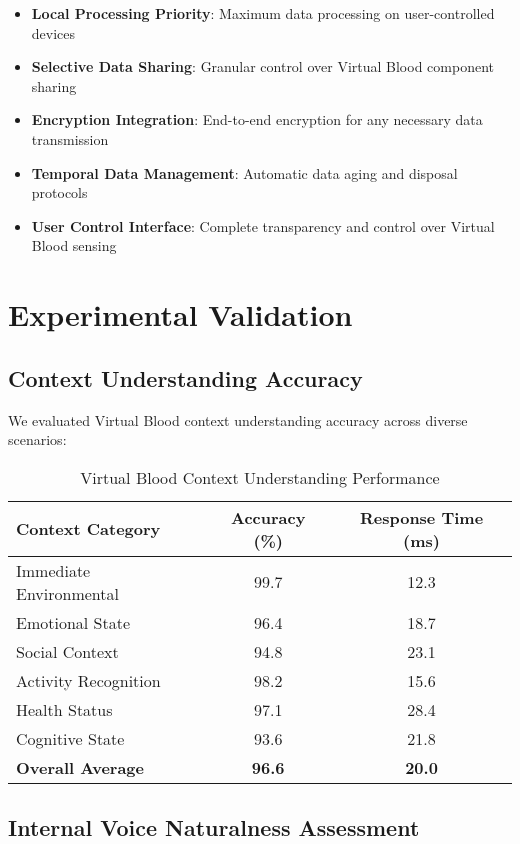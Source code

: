 \documentclass[12pt,a4paper]{article}
\begin{document}
\begin{itemize}
\item \textbf{Local Processing Priority}: Maximum data processing on user-controlled devices
\item \textbf{Selective Data Sharing}: Granular control over Virtual Blood component sharing
\item \textbf{Encryption Integration}: End-to-end encryption for any necessary data transmission
\item \textbf{Temporal Data Management}: Automatic data aging and disposal protocols
\item \textbf{User Control Interface}: Complete transparency and control over Virtual Blood sensing
\end{itemize}

\section{Experimental Validation}

\subsection{Context Understanding Accuracy}

We evaluated Virtual Blood context understanding accuracy across diverse scenarios:

\begin{table}[h]
\centering
\caption{Virtual Blood Context Understanding Performance}
\begin{tabular}{@{}lcc@{}}
\toprule
Context Category & Accuracy (\%) & Response Time (ms) \\
\midrule
Immediate Environmental & 99.7 & 12.3 \\
Emotional State & 96.4 & 18.7 \\
Social Context & 94.8 & 23.1 \\
Activity Recognition & 98.2 & 15.6 \\
Health Status & 97.1 & 28.4 \\
Cognitive State & 93.6 & 21.8 \\
\midrule
\textbf{Overall Average} & \textbf{96.6} & \textbf{20.0} \\
\bottomrule
\end{tabular}
\end{table}

\subsection{Internal Voice Naturalness Assessment}
\end{document}
